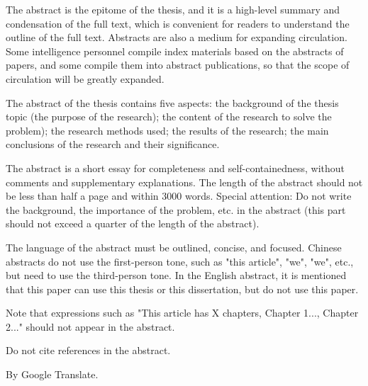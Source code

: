 The abstract is the epitome of the thesis, and it is a high-level summary and condensation of the full text, which is convenient for readers to understand the outline of the full text. Abstracts are also a medium for expanding circulation. Some intelligence personnel compile index materials based on the abstracts of papers, and some compile them into abstract publications, so that the scope of circulation will be greatly expanded.

The abstract of the thesis contains five aspects: the background of the thesis topic (the purpose of the research); the content of the research to solve the problem); the research methods used; the results of the research; the main conclusions of the research and their significance.

The abstract is a short essay for completeness and self-containedness, without comments and supplementary explanations. The length of the abstract should not be less than half a page and within 3000 words. Special attention: Do not write the background, the importance of the problem, etc. in the abstract (this part should not exceed a quarter of the length of the abstract).

The language of the abstract must be outlined, concise, and focused. Chinese abstracts do not use the first-person tone, such as "this article", "we", "we", etc., but need to use the third-person tone. In the English abstract, it is mentioned that this paper can use this thesis or this dissertation, but do not use this paper.

Note that expressions such as "This article has X chapters, Chapter 1..., Chapter 2..." should not appear in the abstract.

Do not cite references in the abstract.

By Google Translate.
